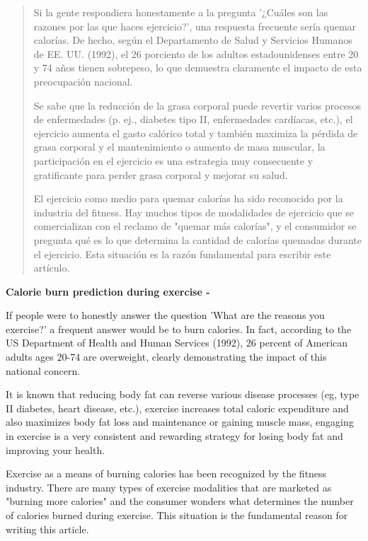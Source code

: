 \documentclass[5p,times,authoryear]{sciarticle}
\begin{document}
\begin{frontmatter}
\begin{abstract}
Si la gente respondiera honestamente a la pregunta '¿Cuáles son las razones por las que haces ejercicio?', una respuesta frecuente sería quemar calorías. De hecho, según el Departamento de Salud y Servicios Humanos de EE. UU. (1992), el 26 porciento de los adultos estadounidenses entre 20 y 74 años tienen sobrepeso, lo que demuestra claramente el impacto de esta preocupación nacional.

Se sabe que la reducción de la grasa corporal puede revertir varios procesos de enfermedades (p. ej., diabetes tipo II, enfermedades cardíacas, etc.), el ejercicio aumenta el gasto calórico total y también maximiza la pérdida de grasa corporal y el mantenimiento o aumento de masa muscular, la participación en el ejercicio es una estrategia muy consecuente y gratificante para perder grasa corporal y mejorar su salud.

El ejercicio como medio para quemar calorías ha sido reconocido por la industria del fitness. Hay muchos tipos de modalidades de ejercicio que se comercializan con el reclamo de "quemar más calorías", y el consumidor se pregunta qué es lo que determina la cantidad de calorías quemadas durante el ejercicio. Esta situación es la razón fundamental para escribir este artículo.
\end{abstract}

\begin{englishtitle}
\noindent \textbf{Calorie burn prediction during exercise -}
\end{englishtitle}

\begin{abstractIng}
If people were to honestly answer the question 'What are the reasons you exercise?' a frequent answer would be to burn calories. In fact, according to the US Department of Health and Human Services (1992), 26 percent of American adults ages 20-74 are overweight, clearly demonstrating the impact of this national concern.

It is known that reducing body fat can reverse various disease processes (eg, type II diabetes, heart disease, etc.), exercise increases total caloric expenditure and also maximizes body fat loss and maintenance or gaining muscle mass, engaging in exercise is a very consistent and rewarding strategy for losing body fat and improving your health.

Exercise as a means of burning calories has been recognized by the fitness industry. There are many types of exercise modalities that are marketed as "burning more calories" and the consumer wonders what determines the number of calories burned during exercise. This situation is the fundamental reason for writing this article.
\end{abstractIng}

\end{frontmatter}
\end{document}
